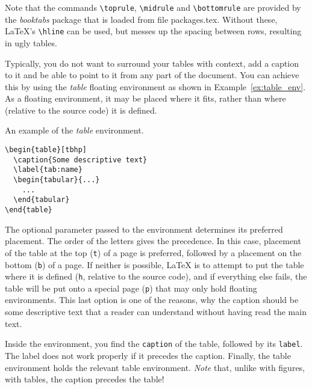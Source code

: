 Note that the commands \verb+\toprule+, \verb+\midrule+ and \verb+\bottomrule+
are provided by the \emph{booktabs} package that is loaded from file
\mbox{packages.tex}. 
Without these, \LaTeX{}'s \verb+\hline+ can be used, but messes up the spacing
between rows, resulting in ugly tables.


Typically, you do not want to surround your tables with context, \eg{} add a
caption to it and be able to point to it from any part of the document.
You can achieve this by using the \emph{table} floating environment as shown in
Example~\ref{ex:table_env}.
As a floating environment, it may be placed where it fits, rather than where
(relative to the source code) it is defined.
\begin{example}
\label{ex:table_env}
An example of the \emph{table} environment.
\begin{verbatim}
\begin{table}[tbhp]
  \caption{Some descriptive text}
  \label{tab:name}
  \begin{tabular}{...}
    ...
  \end{tabular}
\end{table}
\end{verbatim}
The optional parameter passed to the environment determines its preferred
placement.
The order of the letters gives the precedence.
In this case, placement of the table at the top (\verb+t+) of a page is
preferred, followed by a placement on the bottom (\verb+b+) of a page.
If neither is possible, \LaTeX{} is to attempt to put the table where it is
defined (\verb+h+, relative to the source code), and if everything else fails,
the table will be put onto a special page (\verb+p+) that may only hold
floating environments. 
This last option is one of the reasons, why the caption should be some
descriptive text that a reader can understand without having read the main
text.

Inside the environment, you find the \verb+caption+ of the table, followed by
its \verb+label+.
The label does not work properly if it precedes the caption.
Finally, the table environment holds the relevant table environment.
\emph{Note} that, unlike with figures, with tables, the caption precedes the
table!
\end{example}


